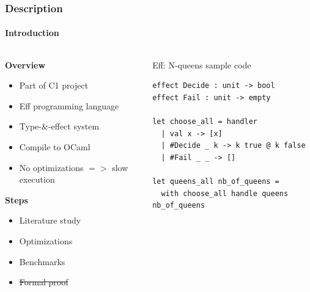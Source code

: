 \documentclass{beamer}
\begin{document}
\begin{frame}[fragile]
\frametitle{Description}
\framesubtitle{Introduction}

\begin{columns}[T] %
\begin{column}{.48\textwidth}

	\textbf{Overview}
	\begin{itemize}
	\item Part of C1 project \cite{project}
	\item Eff programming language \cite{eff}
	\item Type-\&-effect system
	\item Compile to OCaml
	\item No optimizations $=>$ slow execution \cite{KCeff}
	\end{itemize}

	\textbf{Steps}
	\begin{itemize}
	\item Literature study
	\item Optimizations
	\item Benchmarks
	\item \sout{Formal proof}
	\end{itemize}
	
\end{column}%
\hfill%
\begin{column}{.48\textwidth}

	\begin{block}{Eff: N-queens sample code}
	\begin{lstlisting}
effect Decide : unit -> bool
effect Fail : unit -> empty

let choose_all = handler
  | val x -> [x]
  | #Decide _ k -> k true @ k false
  | #Fail _ _ -> []

let queens_all nb_of_queens =
  with choose_all handle queens nb_of_queens
	\end{lstlisting}
	\end{block}

\end{column}%
\end{columns}

\end{frame}

\end{document}
